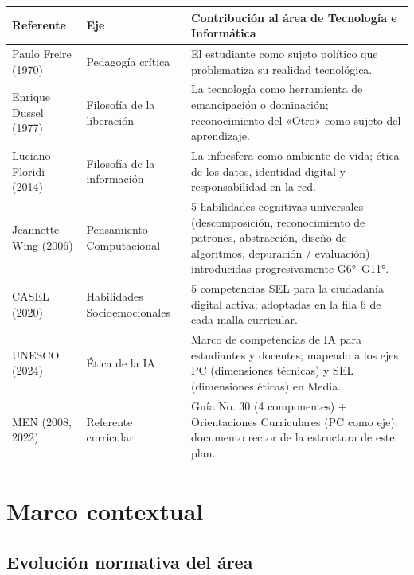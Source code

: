\documentclass[12pt, a4paper]{article}
\begin{document}
\begin{center}
\begin{tabular}{|L{3cm}|L{3cm}|L{8cm}|}
\hline
{}
\color{white}\textbf{Referente} &
\color{white}\textbf{Eje} &
\color{white}\textbf{Contribución al área de Tecnología e Informática} \\
\hline
Paulo Freire (1970) & Pedagogía crítica &
El estudiante como sujeto político que problematiza su realidad tecnológica. \\
\hline
Enrique Dussel (1977) & Filosofía de la liberación &
La tecnología como herramienta de emancipación o dominación; reconocimiento del
«Otro» como sujeto del aprendizaje. \\
\hline
Luciano Floridi (2014) & Filosofía de la información &
La infoesfera como ambiente de vida; ética de los datos, identidad digital y
responsabilidad en la red. \\
\hline
Jeannette Wing (2006) & Pensamiento Computacional &
5 habilidades cognitivas universales (descomposición, reconocimiento de patrones,
abstracción, diseño de algoritmos, depuración / evaluación) introducidas
progresivamente G6°–G11°. \\
\hline
CASEL (2020) & Habilidades Socioemocionales &
5 competencias SEL para la ciudadanía digital activa; adoptadas en la fila 6
de cada malla curricular. \\
\hline
UNESCO (2024) & Ética de la IA &
Marco de competencias de IA para estudiantes y docentes; mapeado a los ejes
PC (dimensiones técnicas) y SEL (dimensiones éticas) en Media. \\
\hline
MEN (2008, 2022) & Referente curricular &
Guía No. 30 (4 componentes) + Orientaciones Curriculares (PC como eje);
documento rector de la estructura de este plan. \\
\hline
\end{tabular}
\end{center}

\section{Marco contextual}

\subsection{Evolución normativa del área}
\end{document}
